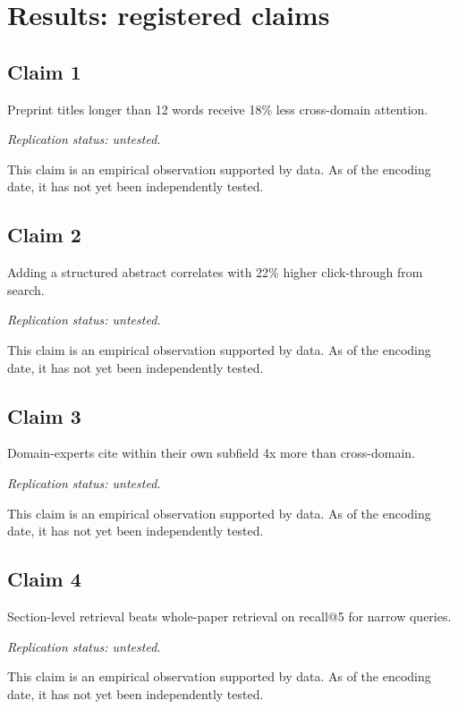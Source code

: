 \documentclass{rrxiv}
\begin{document}
\section{Results: registered claims}
\subsection*{Claim 1}
\begin{claim}[Claim 1]
\label{claim:c1}
Preprint titles longer than 12 words receive 18\% less cross-domain attention.

\emph{Replication status: untested.}
\end{claim}
This claim is an empirical observation supported by data. As of the encoding date, it has not yet been independently tested.

\subsection*{Claim 2}
\begin{claim}[Claim 2]
\label{claim:c2}
Adding a structured abstract correlates with 22\% higher click-through from search.

\emph{Replication status: untested.}
\end{claim}
This claim is an empirical observation supported by data. As of the encoding date, it has not yet been independently tested.

\subsection*{Claim 3}
\begin{claim}[Claim 3]
\label{claim:c3}
Domain-experts cite within their own subfield 4x more than cross-domain.

\emph{Replication status: untested.}
\end{claim}
This claim is an empirical observation supported by data. As of the encoding date, it has not yet been independently tested.

\subsection*{Claim 4}
\begin{claim}[Claim 4]
\label{claim:c4}
Section-level retrieval beats whole-paper retrieval on recall@5 for narrow queries.

\emph{Replication status: untested.}
\end{claim}
This claim is an empirical observation supported by data. As of the encoding date, it has not yet been independently tested.
\end{document}
